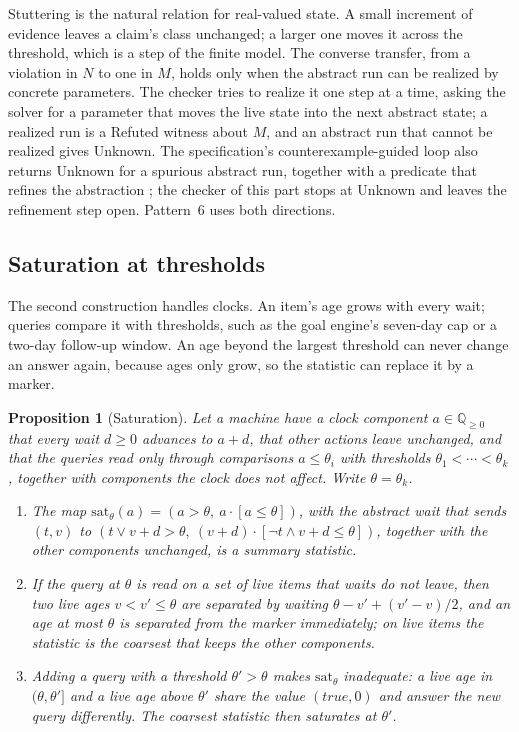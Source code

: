\documentclass[11pt]{article}
\newcommand{\Q}{\mathbb{Q}}
\newcommand{\sat}{\mathrm{sat}}
\theoremstyle{definition}
\theoremstyle{plain}
\newtheorem{proposition}[definition]{Proposition}
\begin{document}
Stuttering is the natural relation for real-valued state. A small increment of evidence leaves a
claim's class unchanged; a larger one moves it across the threshold, which is a step of the finite
model. The converse transfer, from a violation in $N$ to one in $M$, holds only when the abstract
run can be realized by concrete parameters. The checker tries to realize it one step at a time,
asking the solver for a parameter that moves the live state into the next abstract state; a realized
run is a Refuted witness about $M$, and an abstract run that cannot be realized gives Unknown. The
specification's counterexample-guided loop also returns Unknown for a spurious abstract run,
together with a predicate that refines the abstraction \cite[Section~8.2]{spec}; the checker of this
part stops at Unknown and leaves the refinement step open. Pattern~6 uses both directions.

\subsection{Saturation at thresholds}\label{sec:c2}

The second construction handles clocks. An item's age grows with every wait; queries compare it with
thresholds, such as the goal engine's seven-day cap or a two-day follow-up window. An age beyond the
largest threshold can never change an answer again, because ages only grow, so the statistic can
replace it by a marker.

\begin{proposition}[Saturation]\label{prop:sat}
Let a machine have a clock component $a\in\Q_{\ge 0}$ that every wait $d\ge 0$ advances to $a+d$,
that other actions leave unchanged, and that the queries read only through comparisons $a\le
\theta_i$ with thresholds $\theta_1<\cdots<\theta_k$, together with components the clock does not
affect. Write $\theta=\theta_k$.
\begin{enumerate}[label=(\roman*)]
\item The map $\sat_\theta(a)=(a>\theta,\ a\cdot[a\le\theta])$, with the abstract wait that sends
  $(t,v)$ to $(t\lor v+d>\theta,\ (v+d)\cdot[\lnot t\land v+d\le\theta])$, together with the other
  components unchanged, is a summary statistic.
\item If the query at $\theta$ is read on a set of live items that waits do not leave, then two live
  ages $v<v'\le\theta$ are separated by waiting $\theta-v'+(v'-v)/2$, and an age at most $\theta$ is
  separated from the marker immediately; on live items the statistic is the coarsest that keeps the
  other components.
\item Adding a query with a threshold $\theta'>\theta$ makes $\sat_\theta$ inadequate: a live
  age in $(\theta,\theta']$ and a live age above $\theta'$ share the value $(\mathit{true},0)$ and
  answer the new query differently. The coarsest statistic then saturates at $\theta'$.
\end{enumerate}
\end{proposition}
\end{document}
